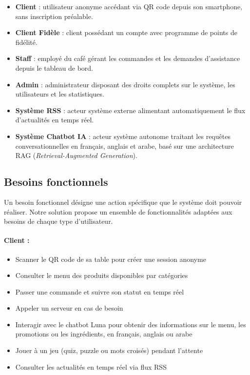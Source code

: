 \begin{itemize}
    \item \textbf{Client} : utilisateur anonyme accédant via QR code depuis son smartphone,
    sans inscription préalable.

    \item \textbf{Client Fidèle} : client possédant un compte avec programme de points de fidélité.

    \item \textbf{Staff} : employé du café gérant les commandes et les demandes d'assistance
    depuis le tableau de bord.

    \item \textbf{Admin} : administrateur disposant des droits complets sur le système, les
    utilisateurs et les statistiques.

    \item \textbf{Système RSS} : acteur système externe alimentant automatiquement le flux
    d'actualités en temps réel.

    \item \textbf{Système Chatbot IA} : acteur système autonome traitant les requêtes
    conversationnelles en français, anglais et arabe, basé sur une architecture RAG
    (\textit{Retrieval-Augmented Generation}).
\end{itemize}

\subsection{Besoins fonctionnels}

Un besoin fonctionnel désigne une action spécifique que le système doit pouvoir réaliser.
Notre solution propose un ensemble de fonctionnalités adaptées aux besoins de chaque
type d'utilisateur.

\paragraph{Client :}
\begin{itemize}
    \item Scanner le QR code de sa table pour créer une session anonyme
    \item Consulter le menu des produits disponibles par catégories
    \item Passer une commande et suivre son statut en temps réel
    \item Appeler un serveur en cas de besoin
    \item Interagir avec le chatbot Luna pour obtenir des informations sur le menu,
          les promotions ou les ingrédients, en français, anglais ou arabe
    \item Jouer à un jeu (quiz, puzzle ou mots croisés) pendant l'attente
    \item Consulter les actualités en temps réel via flux RSS
\end{itemize}

